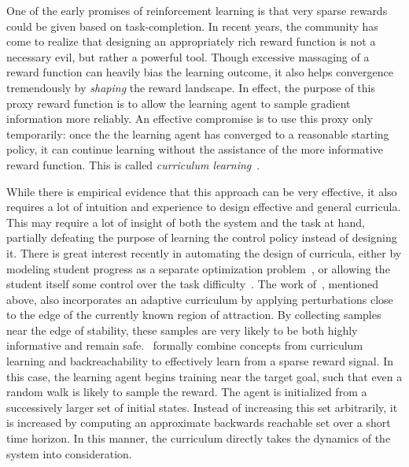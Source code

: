One of the early promises of reinforcement learning is that very sparse rewards could be given based on task-completion. In recent years, the community has come to realize that designing an appropriately rich reward function is not a necessary evil, but rather a powerful tool. Though excessive massaging of a reward function can heavily bias the learning outcome, it also helps convergence tremendously by \emph{shaping} the reward landscape. In effect, the purpose of this proxy reward function is to allow the learning agent to sample gradient information more reliably. An effective compromise is to use this proxy only temporarily: once the the learning agent has converged to a reasonable starting policy, it can continue learning without the assistance of the more informative reward function. This is called \emph{curriculum learning}~\cite{bengio2009curriculum,karpathy2012curriculum}. \par
While there is empirical evidence that this approach can be very effective, it also requires a lot of intuition and experience to design effective and general curricula. This may require a lot of insight of both the system and the task at hand, partially defeating the purpose of learning the control policy instead of designing it. There is great interest recently in automating the design of curricula, either by modeling student progress as a separate optimization problem~\cite{portelas2019teacher}, or allowing the student itself some control over the task difficulty~\cite{klink2019self}. The work of~\textcite{kumar2018improving}, mentioned above, also incorporates an adaptive curriculum  by applying perturbations close to the edge of the currently known region of attraction. By collecting samples near the edge of stability, these samples are very likely to be both highly informative and remain safe.~\textcite{ivanovic2019barc} formally combine concepts from curriculum learning and backreachability to effectively learn from a sparse reward signal. In this case, the learning agent begins training near the target goal, such that even a random walk is likely to sample the reward. The agent is initialized from a successively larger set of initial states. Instead of increasing this set arbitrarily, it is increased by computing an approximate backwards reachable set over a short time horizon. In this manner, the curriculum directly takes the dynamics of the system into consideration.